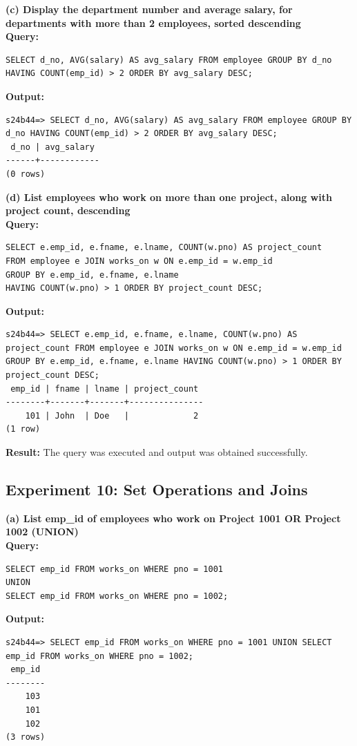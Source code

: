 \documentclass[12pt, a4paper]{article}
\begin{document}
\textbf{(c) Display the department number and average salary, for departments with more than 2 employees, sorted descending}\\
\textbf{Query:}
\begin{lstlisting}
SELECT d_no, AVG(salary) AS avg_salary FROM employee GROUP BY d_no HAVING COUNT(emp_id) > 2 ORDER BY avg_salary DESC;
\end{lstlisting}
\textbf{Output:}
\begin{lstlisting}[style=terminal]
s24b44=> SELECT d_no, AVG(salary) AS avg_salary FROM employee GROUP BY d_no HAVING COUNT(emp_id) > 2 ORDER BY avg_salary DESC;
 d_no | avg_salary 
------+------------
(0 rows)
\end{lstlisting}

\textbf{(d) List employees who work on more than one project, along with project count, descending}\\
\textbf{Query:}
\begin{lstlisting}
SELECT e.emp_id, e.fname, e.lname, COUNT(w.pno) AS project_count 
FROM employee e JOIN works_on w ON e.emp_id = w.emp_id 
GROUP BY e.emp_id, e.fname, e.lname 
HAVING COUNT(w.pno) > 1 ORDER BY project_count DESC;
\end{lstlisting}
\textbf{Output:}
\begin{lstlisting}[style=terminal]
s24b44=> SELECT e.emp_id, e.fname, e.lname, COUNT(w.pno) AS project_count FROM employee e JOIN works_on w ON e.emp_id = w.emp_id GROUP BY e.emp_id, e.fname, e.lname HAVING COUNT(w.pno) > 1 ORDER BY project_count DESC;
 emp_id | fname | lname | project_count 
--------+-------+-------+---------------
    101 | John  | Doe   |             2
(1 row)
\end{lstlisting}
\textbf{Result:} The query was executed and output was obtained successfully.


\newpage
\subsection*{Experiment 10: Set Operations and Joins}

\textbf{(a) List emp\_id of employees who work on Project 1001 OR Project 1002 (UNION)}\\
\textbf{Query:}
\begin{lstlisting}
SELECT emp_id FROM works_on WHERE pno = 1001
UNION
SELECT emp_id FROM works_on WHERE pno = 1002;
\end{lstlisting}
\textbf{Output:}
\begin{lstlisting}[style=terminal]
s24b44=> SELECT emp_id FROM works_on WHERE pno = 1001 UNION SELECT emp_id FROM works_on WHERE pno = 1002;
 emp_id 
--------
    103
    101
    102
(3 rows)
\end{lstlisting}
\end{document}
